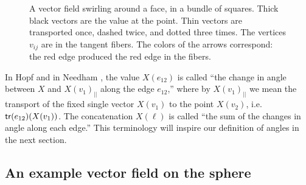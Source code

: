 \begin{figure}[h]
\caption{A vector field swirling around a face, in a bundle of squares. Thick black vectors are the value at the point. Thin vectors are transported once, dashed twice, and dotted three times. The vertices \( v_{ij} \) are in the tangent fibers. The colors of the arrows correspond: the red edge produced the red edge in the fibers.}
\label{fig:swirling}
\end{figure}

In Hopf \cite{hopf} and in Needham \cite{needham}, the value \( X(e_{12}) \) is called ``the change in angle between \( X \) and \( X(v_1)_{||} \) along the edge \( e_{12} \),'' where by \( X(v_1)_{||} \) we mean the transport of the fixed single vector \( X(v_1) \) to the point \( X(v_2) \), i.e. \( \mathsf{tr}(e_{12})(X(v_1)) \). The concatenation \( X(\ell) \) is called ``the sum of the changes in angle along each edge.'' This terminology will inspire our definition of angles in the next section.

\subsection{An example vector field on the sphere}
